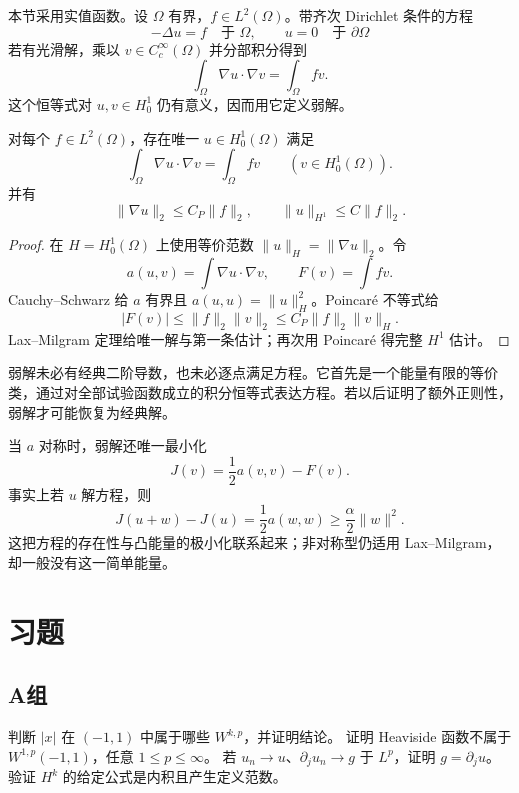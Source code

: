 本节采用实值函数。设 \(\Omega\) 有界，\(f\in L^2(\Omega)\)。带齐次 Dirichlet 条件的方程
\[
 -\Delta u=f\quad\text{于 }\Omega,\qquad u=0\quad\text{于 }\partial\Omega
\]
若有光滑解，乘以 \(v\in C_c^\infty(\Omega)\) 并分部积分得到
\[
 \int_\Omega\nabla u\cdot\nabla v=\int_\Omega fv.
\]
这个恒等式对 \(u,v\in H_0^1\) 仍有意义，因而用它定义弱解。

\begin{theorem}\label{thm:poisson-weak-existence}
对每个 \(f\in L^2(\Omega)\)，存在唯一 \(u\in H_0^1(\Omega)\) 满足
\[
 \int_\Omega\nabla u\cdot\nabla v=\int_\Omega fv
 \qquad(v\in H_0^1(\Omega)).
\]
并有
\[
 \|\nabla u\|_2\le C_P\|f\|_2,\qquad
 \|u\|_{H^1}\le C\|f\|_2.
\]
\end{theorem}
\begin{proof}
在 \(H=H_0^1(\Omega)\) 上使用等价范数
\(\|u\|_H=\|\nabla u\|_2\)。令
\[
 a(u,v)=\int\nabla u\cdot\nabla v,\qquad F(v)=\int fv.
\]
Cauchy--Schwarz 给 \(a\) 有界且 \(a(u,u)=\|u\|_H^2\)。Poincaré 不等式给
\[
 |F(v)|\le\|f\|_2\|v\|_2\le C_P\|f\|_2\|v\|_H.
\]
Lax--Milgram 定理给唯一解与第一条估计；再次用 Poincaré 得完整
\(H^1\) 估计。
\end{proof}

弱解未必有经典二阶导数，也未必逐点满足方程。它首先是一个能量有限的等价
类，通过对全部试验函数成立的积分恒等式表达方程。若以后证明了额外正则性，
弱解才可能恢复为经典解。

当 \(a\) 对称时，弱解还唯一最小化
\[
 J(v)=\frac12a(v,v)-F(v).
\]
事实上若 \(u\) 解方程，则
\[
 J(u+w)-J(u)=\frac12a(w,w)\ge\frac\alpha2\|w\|^2.
\]
这把方程的存在性与凸能量的极小化联系起来；非对称型仍适用
Lax--Milgram，却一般没有这一简单能量。

\section*{习题}
\subsection*{A组}
\begin{enumerate}[label=\textbf{\thechapter.\arabic*.}]
判断 \(|x|\) 在 \((-1,1)\) 中属于哪些 \(W^{k,p}\)，并证明结论。
证明 Heaviside 函数不属于 \(W^{1,p}(-1,1)\)，任意 \(1\le p\le\infty\)。
若 \(u_n\to u\)、\(\partial_ju_n\to g\) 于 \(L^p\)，证明 \(g=\partial_ju\)。
验证 \(H^k\) 的给定公式是内积且产生定义范数。
\end{enumerate}
